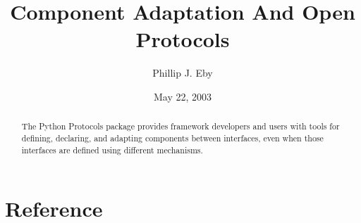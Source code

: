 \documentclass{manual}
\title{Component Adaptation And Open Protocols}
\author{Phillip J. Eby}
\date{May 22, 2003}       %
\begin{document}
\maketitle


%

\begin{abstract}

\noindent

The Python Protocols package provides framework developers and users with
tools for defining, declaring, and adapting components between interfaces,
even when those interfaces are defined using different mechanisms.

\end{abstract}

\tableofcontents

\chapter{Reference}













%
%
%
\renewcommand{\indexname}{Module Index}

\renewcommand{\indexname}{Index}
\end{document}
